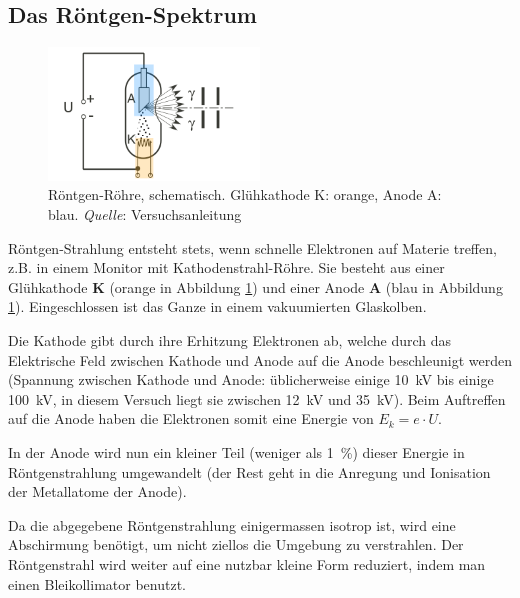 \subsection{Das R\"ontgen-Spektrum}
\label{subsec:rontgenSpektrum}

\begin{figure}[h!]
    \centering
    \includegraphics[width=0.5\textwidth]{images/rontgen-rohre.png}
    \caption{%
        R\"ontgen-R\"ohre,  schematisch. Gl\"uhkathode  K:  orange,  Anode  A:
        blau. \emph{Quelle}: Versuchsanleitung
    }
    \label{fig:rontgenRohre}
\end{figure}

R\"ontgen-Strahlung   entsteht    stets,   wenn   schnelle    Elektronen   auf
Materie  treffen,  z.B.  in   einem  Monitor  mit  Kathodenstrahl-R\"ohre. Sie
besteht   aus   einer   Gl\"uhkathode    \textbf{K}   (orange   in   Abbildung
\ref{fig:rontgenRohre})  und   einer  Anode  \textbf{A}  (blau   in  Abbildung
\ref{fig:rontgenRohre}). Eingeschlossen  ist das  Ganze in  einem vakuumierten
Glaskolben.

Die  Kathode  gibt  durch  ihre  Erhitzung Elektronen  ab,  welche  durch  das
Elektrische  Feld  zwischen  Kathode  und Anode  auf  die  Anode  beschleunigt
werden   (Spannung  zwischen   Kathode  und   Anode:  \"ublicherweise   einige
\SI{10}{\kilo\volt} bis  einige \SI{100}{\kilo\volt}, in diesem  Versuch liegt
sie  zwischen \SI{12}{\kilo\volt}  und \SI{35}{\kilo\volt}).   Beim Auftreffen
auf die Anode haben die Elektronen somit eine Energie von $E_k = e \cdot U$.

In der Anode  wird nun ein kleiner Teil (weniger  als \SI{1}{\percent}) dieser
Energie in R\"ontgenstrahlung  umgewandelt (der Rest geht in  die Anregung und
Ionisation der Metallatome der Anode).

Da  die abgegebene  R\"ontgenstrahlung  einigermassen isotrop  ist, wird  eine
Abschirmung  ben\"otigt, um  nicht  ziellos die  Umgebung zu  verstrahlen. Der
R\"ontgenstrahl wird weiter auf eine  nutzbar kleine Form reduziert, indem man
einen Bleikollimator benutzt.

